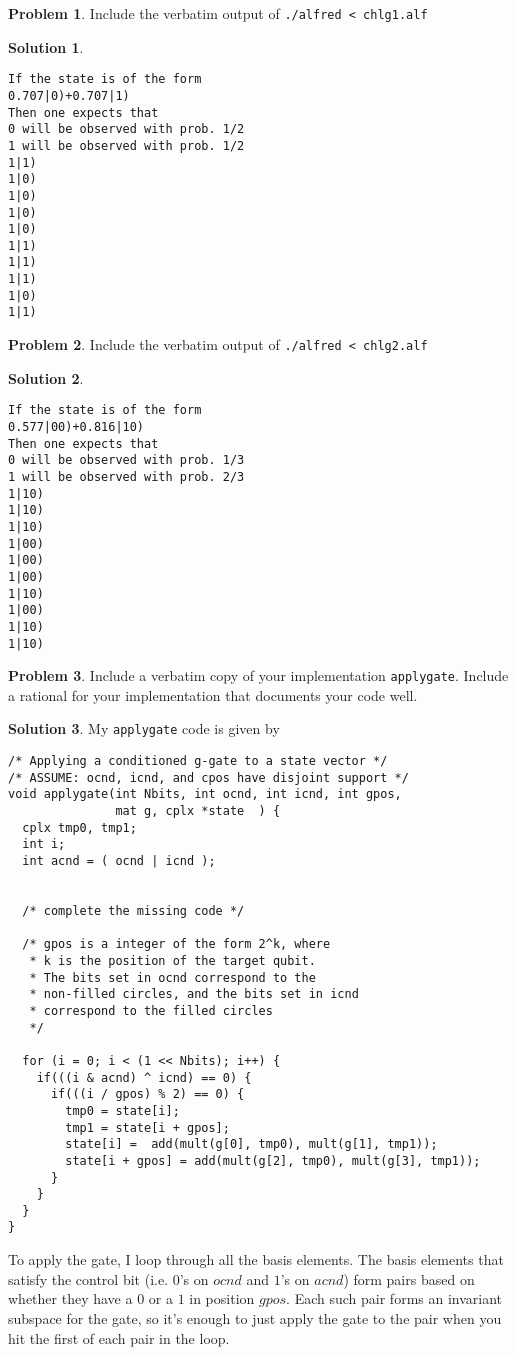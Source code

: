 \documentclass[12pt,a4paper]{article}
\theoremstyle{definition}
\newtheorem{problem}{Problem}
\newtheorem*{solution}{Solution}
\begin{document}
\begin{problem}
Include the verbatim output of \verb|./alfred < chlg1.alf|
\end{problem}
\begin{solution}
\begin{verbatim}
If the state is of the form
0.707|0)+0.707|1)
Then one expects that
0 will be observed with prob. 1/2
1 will be observed with prob. 1/2
1|1)
1|0)
1|0)
1|0)
1|0)
1|1)
1|1)
1|1)
1|0)
1|1)
\end{verbatim}
\end{solution}

\begin{problem}
Include the verbatim output of \verb|./alfred < chlg2.alf|
\end{problem}
\begin{solution}
\begin{verbatim}
If the state is of the form
0.577|00)+0.816|10)
Then one expects that
0 will be observed with prob. 1/3
1 will be observed with prob. 2/3
1|10)
1|10)
1|10)
1|00)
1|00)
1|00)
1|10)
1|00)
1|10)
1|10)
\end{verbatim}
\end{solution}

\begin{problem}
Include a verbatim copy of your implementation \verb|applygate|. 
Include a rational for your implementation that documents your code
well. 
\end{problem}
\begin{solution}
My \verb|applygate| code is given by 
\begin{verbatim}
/* Applying a conditioned g-gate to a state vector */ 
/* ASSUME: ocnd, icnd, and cpos have disjoint support */
void applygate(int Nbits, int ocnd, int icnd, int gpos, 	       
               mat g, cplx *state  ) { 
  cplx tmp0, tmp1; 
  int i;
  int acnd = ( ocnd | icnd ); 
  

  /* complete the missing code */

  /* gpos is a integer of the form 2^k, where 
   * k is the position of the target qubit. 
   * The bits set in ocnd correspond to the 
   * non-filled circles, and the bits set in icnd
   * correspond to the filled circles
   */ 

  for (i = 0; i < (1 << Nbits); i++) {
    if(((i & acnd) ^ icnd) == 0) {
      if(((i / gpos) % 2) == 0) {
        tmp0 = state[i];
        tmp1 = state[i + gpos];
        state[i] =  add(mult(g[0], tmp0), mult(g[1], tmp1));
        state[i + gpos] = add(mult(g[2], tmp0), mult(g[3], tmp1));
      }
    }
  }
}
\end{verbatim}
To apply the gate, I loop through all the basis elements.  The basis elements
that satisfy the control bit (i.e. $0$'s on $ocnd$ and $1$'s on $acnd$) form
pairs based on whether they have a $0$ or a $1$ in position $gpos$.  Each such 
pair forms an invariant subspace for the gate, so it's enough to just apply the
gate to the pair when you hit the first of each pair in the loop.  
\end{solution}
\end{document}

